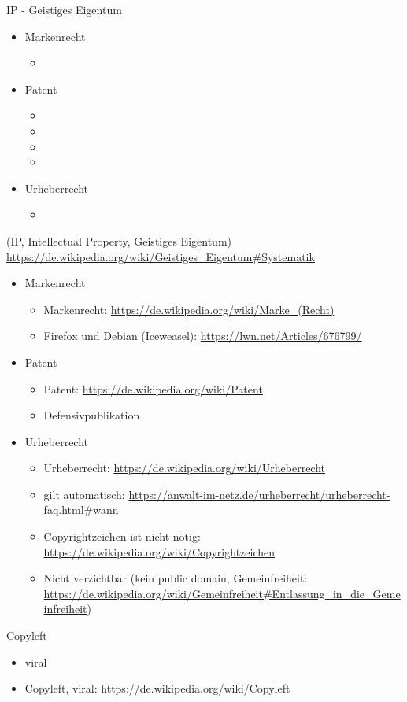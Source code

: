 \begin{frame}{IP - Geistiges Eigentum}
	\begin{itemize}
		\item Markenrecht
		\begin{itemize}
			\item {}
		\end{itemize}
		\item Patent
		\begin{itemize}
			\item {}
			\item {}
			\item {}
			\item {}
		\end{itemize}
		\item Urheberrecht
		\begin{itemize}
			\item {}
		\end{itemize}
	\end{itemize}
\end{frame}
\note
{
	(IP, Intellectual Property, Geistiges Eigentum) \url{https://de.wikipedia.org/wiki/Geistiges\_Eigentum\#Systematik}
	\begin{itemize}
		\item Markenrecht
		\begin{itemize}
			\item Markenrecht: \url{https://de.wikipedia.org/wiki/Marke_(Recht)}
			\item Firefox und Debian (Iceweasel): \url{https://lwn.net/Articles/676799/}
		\end{itemize}
		\item Patent
		\begin{itemize}
			\item Patent: \url{https://de.wikipedia.org/wiki/Patent}
			\item Defensivpublikation
		\end{itemize}
		\item Urheberrecht
		\begin{itemize}
			\item Urheberrecht: \url{https://de.wikipedia.org/wiki/Urheberrecht}
			\item gilt automatisch: \url{https://anwalt-im-netz.de/urheberrecht/urheberrecht-faq.html\#wann}
			\item Copyrightzeichen ist nicht nötig: \url{https://de.wikipedia.org/wiki/Copyrightzeichen}
			\item Nicht verzichtbar (kein public domain, Gemeinfreiheit: \url{https://de.wikipedia.org/wiki/Gemeinfreiheit\#Entlassung\_in\_die\_Gemeinfreiheit})
		\end{itemize}
	\end{itemize}
}

\begin{frame}{Copyleft}
	\begin{itemize}
		\item viral
	\end{itemize}
\end{frame}
\note
{
	\begin{itemize}
		\item Copyleft, viral: https://de.wikipedia.org/wiki/Copyleft
	\end{itemize}
}


